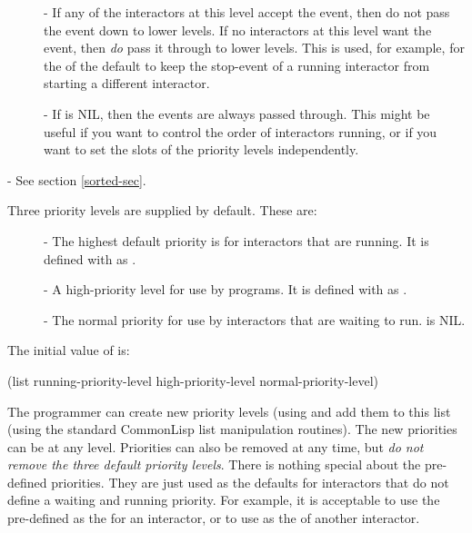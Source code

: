 \begin{description}
\begin{description}
\item[] 
- If any of the interactors at this level accept the event, then do not
pass the event down to lower levels.  If no interactors at this level want
the event, then {\it do} pass it through to lower levels.  This is used, for
example, for the  of the default
 to keep the stop-event of a running interactor
from starting a different interactor.

\item[] 
- If  is NIL, then the events are always passed through.
This might be useful if you want to control the order of interactors
running, or if you want to set the  slots of the priority
levels independently.
\end{description}

\item[]  - See section \ref{sorted-sec}.
\end{description}

Three priority levels are supplied by default.  These are:
\begin{description}
\item[] 
- The highest default priority is for interactors that are running.   It is
defined with  as .

\item[] 
- A high-priority level for use by programs.  It is
defined with  as .

\item[] 
- The normal priority for use by interactors that are waiting to run.
 is NIL.
\end{description}

The initial value of  is:
\begin{programexample}
(list running-priority-level high-priority-level normal-priority-level)
\end{programexample}

The programmer can create new priority levels (using
 and add them to this
list (using the standard CommonLisp list manipulation routines).
The new priorities can be at any level.  Priorities can also be removed at
any time, but {\it do not remove the three default priority levels}.
There is nothing special about the pre-defined priorities.  They are just
used as the defaults for interactors that do not define a waiting and
running priority.  For example, it is acceptable to use the pre-defined
 as the  for an
interactor, or to use  as the
 of another interactor.

